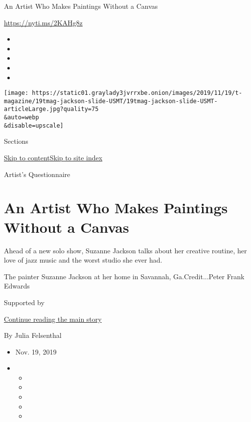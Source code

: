 An Artist Who Makes Paintings Without a Canvas

\url{https://nyti.ms/2KAHg8z}

\begin{itemize}
\item
\item
\item
\item
\item
\end{itemize}

\texttt{[image: https://static01.graylady3jvrrxbe.onion/images/2019/11/19/t-magazine/19tmag-jackson-slide-USMT/19tmag-jackson-slide-USMT-articleLarge.jpg?quality=75\\\&auto=webp\\\&disable=upscale]}

Sections

\protect\hyperlink{site-content}{Skip to
content}\protect\hyperlink{site-index}{Skip to site index}

Artist's Questionnaire

\hypertarget{an-artist-who-makes-paintings-without-a-canvas}{%
\section{An Artist Who Makes Paintings Without a
Canvas}\label{an-artist-who-makes-paintings-without-a-canvas}}

Ahead of a new solo show, Suzanne Jackson talks about her creative
routine, her love of jazz music and the worst studio she ever had.

The painter Suzanne Jackson at her home in Savannah, Ga.Credit...Peter
Frank Edwards

Supported by

\protect\hyperlink{after-sponsor}{Continue reading the main story}

By Julia Felsenthal

\begin{itemize}
\item
  Nov. 19, 2019
\item
  \begin{itemize}
  \item
  \item
  \item
  \item
  \item
  \end{itemize}
\end{itemize}

